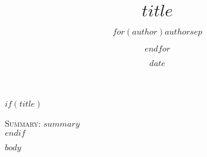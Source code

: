 \documentclass[Letter, 12pt]{report}
\title{$title$}
\author{$for(author)$$author$$sep$ \and $endfor$}
\date{$date$}
\begin{document}
$if(title)$
\maketitle
\textsc{Summary}: $summary$ \\
$endif$ 

\pagebreak

$body$
\end{document}

